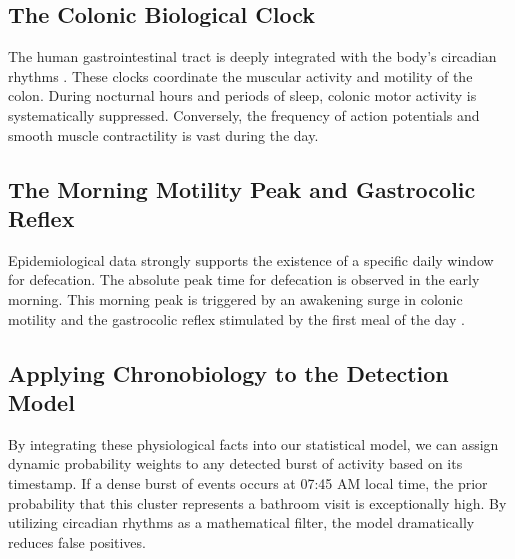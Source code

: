 \documentclass[twocolumn]{article}
\begin{document}
\subsection{The Colonic Biological Clock}
The human gastrointestinal tract is deeply integrated with the body's circadian rhythms \cite{hibberd2023}. These clocks coordinate the muscular activity and motility of the colon. During nocturnal hours and periods of sleep, colonic motor activity is systematically suppressed. Conversely, the frequency of action potentials and smooth muscle contractility is vast during the day.

\subsection{The Morning Motility Peak and Gastrocolic Reflex}
Epidemiological data strongly supports the existence of a specific daily window for defecation. The absolute peak time for defecation is observed in the early morning. This morning peak is triggered by an awakening surge in colonic motility and the gastrocolic reflex stimulated by the first meal of the day \cite{hibberd2023}.

\subsection{Applying Chronobiology to the Detection Model}
By integrating these physiological facts into our statistical model, we can assign dynamic probability weights to any detected burst of activity based on its timestamp. If a dense burst of events occurs at 07:45 AM local time, the prior probability that this cluster represents a bathroom visit is exceptionally high. By utilizing circadian rhythms as a mathematical filter, the model dramatically reduces false positives.

\begin{table}[h!]
	\centering
	\caption{Bayesian Priors based on Circadian Rhythm}
\end{table}
\end{document}
